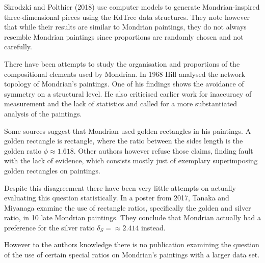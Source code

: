 \documentclass[serif,article,noparskip]{agse-thesis}
\begin{document}
Skrodzki and Polthier (2018) \cite{Skrodzki2018} use computer models to generate
Mondrian-inspired three-dimensional pieces using the KdTree data structures.
They note however that while their results are similar to Mondrian paintings,
they do not always resemble Mondrian paintings since proportions are randomly
chosen and not carefully.

There have been attempts to study the organisation and proportions of the
compositional elements used by Mondrian. In 1968 Hill \cite{Hill1968} analysed
the network topology of Mondrian's paintings. One of his findings shows the
avoidance of symmetry on a structural level. He also criticised earlier work for
inaccuracy of measurement and the lack of statistics and called for a more
substantiated analysis of the paintings.

Some sources \cite{bouleau1963,bergamini1980} suggest that Mondrian used golden
rectangles in his paintings. A golden rectangle is rectangle, where the ratio
between the sides length is the golden ratio $\phi \approx 1.618$. Other authors
however \cite{Livio2002,Markowsky1992} refuse those claims, finding fault with
the lack of evidence, which consists mostly just of exemplary superimposing
golden rectangles on paintings.

Despite this disagreement there have been very little attempts on actually
evaluating this question statistically. In a poster from 2017, Tanaka and
Miyanaga \cite{Tanaka2017} examine the use of rectangle ratios, specifically the
golden and silver ratio, in 10 late Mondrian paintings. They conclude that
Mondrian actually had a preference for the silver ratio $\delta_S = \approx 2.414$ instead.

However to the authors knowledge there is no publication examining the question of
the use of certain special ratios on Mondrian's paintings with a larger data
set.

\end{document}
